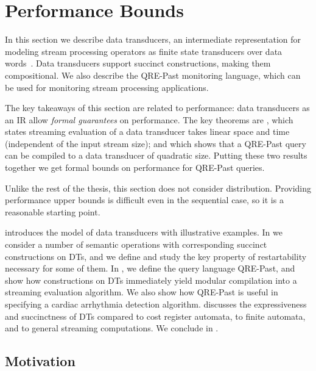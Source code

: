 \chapter{Performance Bounds}
\label{cha:monitoring}

In this section we describe data transducers,
an intermediate representation for modeling
stream processing operators as finite state transducers
over data words~.
Data transducers support succinct constructions, making them
compositional.
We also describe the QRE-Past monitoring language, which
can be used for monitoring stream processing applications.

The key takeaways of this section are related to performance: data transducers
as an IR allow \emph{formal guarantees} on performance.
The key theorems are , which states streaming evaluation of a data transducer takes linear space and time (independent of the input stream size); and  which shows that a QRE-Past query can be compiled to a data transducer of quadratic size.
Putting these two results together we get formal bounds on performance for QRE-Past queries.

Unlike the rest of the thesis, this section does not consider distribution.
Providing performance upper bounds is difficult even in the sequential case, so it is a reasonable starting point.

 introduces the model of data transducers with illustrative examples.
In  we consider a number of semantic operations with
corresponding succinct constructions on DTs, and we define and study the key property of restartability
necessary for some of them.
In , we define the query language QRE-Past, and show how constructions on DTs
immediately yield modular compilation into a streaming evaluation algorithm.
We also show how QRE-Past is useful in specifying a cardiac arrhythmia
detection algorithm. %
 discusses the expressiveness and succinctness of DTs compared to cost register automata, to finite automata, and to general streaming computations.
We conclude in .

\section{Motivation}

